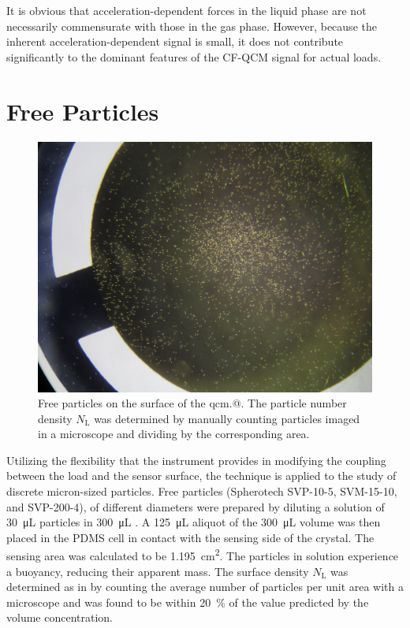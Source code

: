 It is obvious that acceleration-dependent forces in the liquid phase are not
necessarily commensurate with those in the gas phase.  However, because the
inherent acceleration-dependent signal is small, it does not contribute
significantly to the dominant features of the CF-QCM signal for actual loads.

\section{Free Particles}
\begin{figure}
  \centering
  \includegraphics[keepaspectratio,width=12cm]{qcm/figures/qcm_beadssurface.jpg}
  \caption{Free particles on the surface of the \gls{qcm}.@.  The particle number
    density $N_\mathrm{L}$ was determined by manually counting
    particles imaged in a microscope and dividing by the corresponding area.}
  \label{fig:countparticles}
\end{figure}
Utilizing the flexibility that the instrument provides in modifying the
coupling between the load and the sensor surface, the technique is applied
to the study of discrete micron-sized particles.
Free particles (Spherotech SVP-10-5, SVM-15-10, and SVP-200-4), of
different diameters were prepared by diluting a solution of
\SI{30}{\micro\liter} particles in \SI{300}{\micro\liter} .  A
\SI{125}{\micro\liter} aliquot of the \SI{300}{\micro\liter} volume was
then placed in the PDMS cell in contact with the sensing side of the
crystal.  The sensing area was calculated to be
\SI{1.195}{\centi\meter\squared}.  The particles in solution experience a
buoyancy, reducing their apparent mass. The surface density
$N_\mathrm{L}$ was determined as in  by counting the average number of particles
per unit area with a microscope and was found to be within
\SI{20}{\percent} of the value predicted by the volume concentration.

